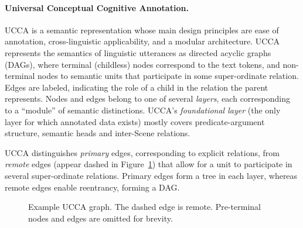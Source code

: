 \documentclass[11pt,a4paper]{article}
\begin{document}
\paragraph{Universal Conceptual Cognitive Annotation.}\label{sec:ucca}
UCCA \cite{abend2013universal} is a semantic representation whose main design principles
are ease of annotation, cross-linguistic applicability, and a modular architecture.
UCCA represents the semantics of linguistic utterances
as directed acyclic graphs (DAGs), where terminal (childless) nodes
correspond to the text tokens, and non-terminal nodes to semantic units that participate
in some super-ordinate relation.
Edges are labeled, indicating the role of a child in the relation the parent represents.
Nodes and edges belong to one of several \textit{layers}, each corresponding
to a ``module'' of semantic distinctions.
UCCA's \textit{foundational layer} (the only layer for which annotated data exists)
mostly covers predicate-argument structure, semantic heads and inter-Scene relations.

UCCA distinguishes \textit{primary} edges, corresponding 
to explicit relations, from \textit{remote} edges (appear dashed in
Figure~\ref{fig:example_ucca}) that allow for a unit to participate
in several super-ordinate relations.
Primary edges form a tree in each layer, whereas remote edges enable reentrancy, forming a DAG.


\begin{figure}[!ht]
  \centering
\caption{\label{fig:example_ucca}
 Example UCCA graph. The dashed edge is remote.
  Pre-terminal nodes and edges are omitted for brevity.}
\end{figure}
\end{document}

